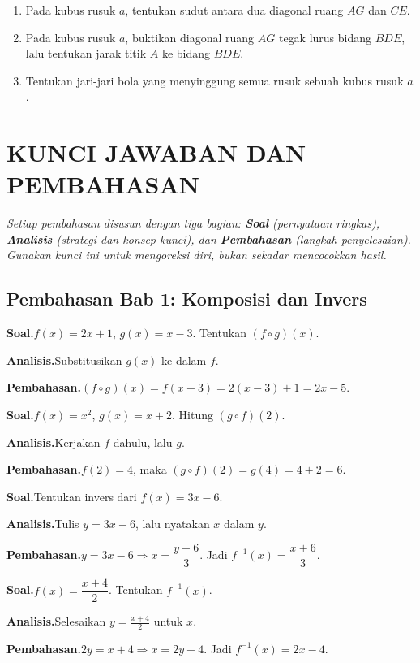 \documentclass[11pt,a4paper]{report}
\theoremstyle{gaya}
\newcommand{\knomor}[1]{\par\medskip\noindent{\bfseries\color{ungu}#1}\par\nopagebreak}
\newcommand{\ksoal}{\noindent\textbf{\color{biru}Soal.}\space}
\newcommand{\kanalisis}{\par\noindent\textbf{\color{oranye}Analisis.}\space}
\newcommand{\kbahas}{\par\noindent\textbf{\color{hijau}Pembahasan.}\space}
\newcommand{\kbagian}[1]{\par\medskip\noindent{\large\bfseries\color{biru}#1}\par\smallskip}
\begin{document}
\begin{challenge}
\begin{enumerate}[leftmargin=*,topsep=2pt]
  \item Pada kubus rusuk $a$, tentukan sudut antara dua diagonal ruang $AG$ dan $CE$.
  \item Pada kubus rusuk $a$, buktikan diagonal ruang $AG$ tegak lurus bidang $BDE$, lalu tentukan jarak titik $A$ ke bidang $BDE$.
  \item Tentukan jari-jari bola yang menyinggung semua rusuk sebuah kubus rusuk $a$.
\end{enumerate}
\end{challenge}

\part*{\centering KUNCI JAWABAN DAN PEMBAHASAN}
\noindent\textit{Setiap pembahasan disusun dengan tiga bagian: \textbf{Soal} (pernyataan ringkas), \textbf{Analisis} (strategi dan konsep kunci), dan \textbf{Pembahasan} (langkah penyelesaian). Gunakan kunci ini untuk mengoreksi diri, bukan sekadar mencocokkan hasil.}

\chapter{Pembahasan Bab 1: Komposisi dan Invers}

\kbagian{Bagian A}

\knomor{A.1}
\ksoal $f(x)=2x+1$, $g(x)=x-3$. Tentukan $(f\circ g)(x)$.
\kanalisis Substitusikan $g(x)$ ke dalam $f$.
\kbahas $(f\circ g)(x)=f(x-3)=2(x-3)+1=2x-5.$

\knomor{A.2}
\ksoal $f(x)=x^2$, $g(x)=x+2$. Hitung $(g\circ f)(2)$.
\kanalisis Kerjakan $f$ dahulu, lalu $g$.
\kbahas $f(2)=4$, maka $(g\circ f)(2)=g(4)=4+2=6.$

\knomor{A.3}
\ksoal Tentukan invers dari $f(x)=3x-6$.
\kanalisis Tulis $y=3x-6$, lalu nyatakan $x$ dalam $y$.
\kbahas $y=3x-6\Rightarrow x=\dfrac{y+6}{3}$. Jadi $f^{-1}(x)=\dfrac{x+6}{3}.$

\knomor{A.4}
\ksoal $f(x)=\dfrac{x+4}{2}$. Tentukan $f^{-1}(x)$.
\kanalisis Selesaikan $y=\tfrac{x+4}{2}$ untuk $x$.
\kbahas $2y=x+4\Rightarrow x=2y-4$. Jadi $f^{-1}(x)=2x-4.$
\end{document}
